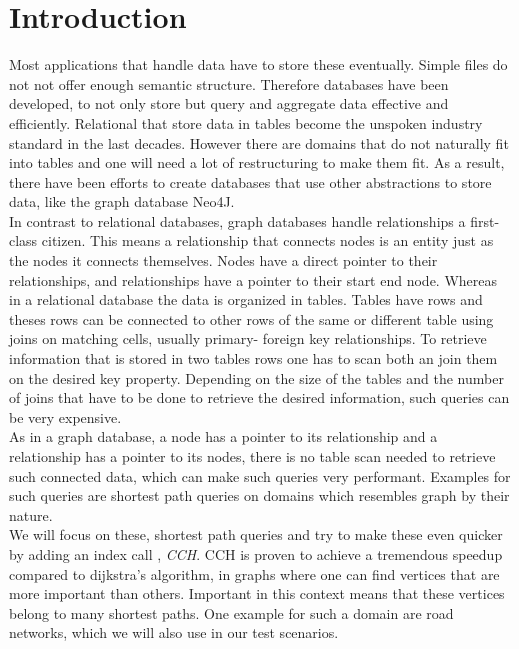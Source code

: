 \chapter{Introduction}

Most applications that handle data have to store these eventually.
Simple files do not not offer enough semantic structure.
Therefore databases have been developed, to not only store but query and aggregate data effective and efficiently.
Relational that store data in tables become the unspoken industry standard in the last decades. 
However there are domains that do not naturally fit into tables and one will need a lot of restructuring to make them fit.
As a result, there have been efforts to create databases that use other abstractions to store data, like the graph database Neo4J.
\\
In contrast to relational databases, graph databases handle relationships a first-class citizen.
This means a relationship that connects nodes is an entity just as the nodes it connects themselves.
Nodes have a direct pointer to their relationships, and relationships have a pointer to their start end node.
Whereas in a relational database the data is organized in tables.
Tables have rows and theses rows can be connected to other rows of the same or different table using joins on matching cells, usually primary- foreign key relationships.
To retrieve information that is stored in two tables rows one has to scan both an join them on the desired key property.
Depending on the size of the tables and the number of joins that have to be done to retrieve the desired information, such queries can be very expensive.
\\
As in a graph database, a node has a pointer to its relationship and a relationship has a pointer to its nodes, there is no table scan needed to retrieve such connected data, which can make such queries very performant.
Examples for such queries are shortest path queries on domains which resembles graph by their nature.
\\
We will focus on these, shortest path queries and try to make these even quicker by adding an index call \cite[Customization Contraction Hierarchies]{CCH}, \textit{CCH}. 
CCH is proven to achieve a tremendous speedup compared to dijkstra's algorithm, in graphs where one can find vertices that are more important than others.
Important in this context means that these vertices belong to many shortest paths.
One example for such a domain are road networks, which we will also use in our test scenarios.

